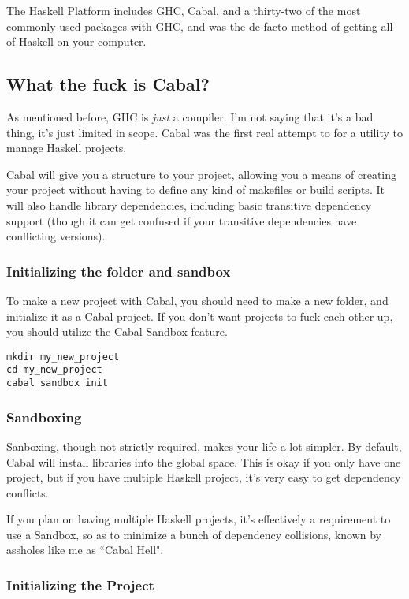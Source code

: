 The Haskell Platform includes GHC, Cabal, and a thirty-two of the most commonly used packages with GHC, and was the de-facto method of getting all of Haskell on your computer. 

\subsection{What the fuck is Cabal?}
As mentioned before, GHC is \textit{just} a compiler.  I'm not saying that it's a bad thing, it's just limited in scope.  Cabal was the first real attempt to for a utility to manage Haskell projects.  

Cabal will give you a structure to your project, allowing you a means of creating your project without having to define any kind of makefiles or build scripts.  It will also handle library dependencies, including basic transitive dependency support (though it can get confused if your transitive dependencies have conflicting versions). 

\subsubsection{Initializing the folder and sandbox}
To make a new project with Cabal, you should need to make a new folder, and initialize it as a Cabal project.  If you don't want projects to fuck each other up, you should utilize the Cabal Sandbox feature. 

\begin{verbatim}
mkdir my_new_project
cd my_new_project
cabal sandbox init
\end{verbatim}

\subsubsection{Sandboxing}
Sanboxing, though not strictly required, makes your life a lot simpler. By default, Cabal will install libraries into the global space.  This is okay if you only have one project, but if you have multiple Haskell project, it's very easy to get dependency conflicts. 

If you plan on having multiple Haskell projects, it's effectively a requirement to use a Sandbox, so as to minimize a bunch of dependency collisions, known by assholes like me as ``Cabal Hell".  

\subsubsection{Initializing the Project}

